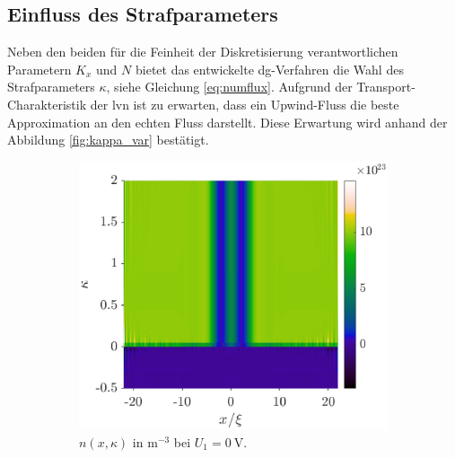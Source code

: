 \subsection{Einfluss des Strafparameters} \label{sec:kappa_var}
Neben den beiden für die Feinheit der Diskretisierung verantwortlichen Parametern $K_x$ und $N$ bietet das entwickelte \ac{dg}-Verfahren die Wahl des Strafparameters $\kappa$, siehe Gleichung \eqref{eq:numflux}. Aufgrund der Transport-Charakteristik der \ac{lvn} ist zu erwarten, dass ein Upwind-Fluss  die beste Approximation an den echten Fluss darstellt. Diese Erwartung wird anhand der Abbildung \ref{fig:kappa_var} bestätigt.
\begin{figure}
    \centering
    \begin{subfigure}[b]{0.48\textwidth}
        \centering
        \includegraphics[width=\textwidth]{plots/kappa/kappa_variation_0V_n.eps}
        \caption[]%
        {{\small $n(x,\kappa)$ in m$^{-3}$ bei $U_1=\SI{0}{\volt}$.}}
    \end{subfigure}
    \hfill
    \begin{subfigure}[b]{0.48\textwidth}
        \centering

\end{subfigure}
\end{figure}
